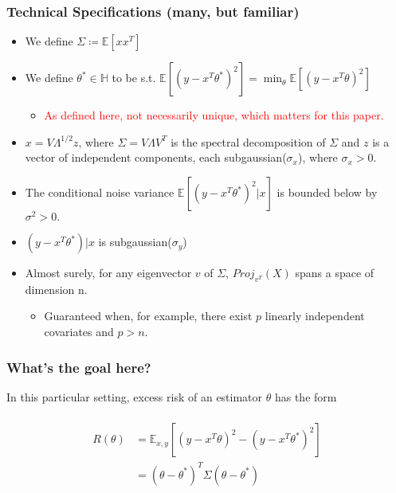 \documentclass[pdf]{beamer}
\begin{document}
\begin{frame}
\fontsize{9pt}{8pt}
\frametitle{Technical Specifications (many, but familiar)}

\begin{itemize}
\item We define $\Sigma \coloneqq \mathbb{E}[xx^{T}]$
\item We define $\theta^{*} \in \mathbb{H}$ to be s.t. $\mathbb{E}[(y - x^{T}\theta^{*})^{2}] = \min_{\theta}\mathbb{E}[(y - x^{T}\theta)^{2}]$
\begin{itemize}
    \fontsize{9pt}{8pt}
    \item \textcolor{red}{As defined here, not necessarily unique, which matters for this paper.}
\end{itemize}
\item $x = V\Lambda^{1/2}z$, where $\Sigma = V\Lambda V^{T}$ is the spectral decomposition of $\Sigma$ and $z$ is a vector of independent components, each subgaussian($\sigma_{x}$), where $\sigma_{x} > 0.$
\item The conditional noise variance $\mathbb{E}[(y - x^{T}\theta^{*})^{2}|x]$ is bounded below by $\sigma^{2} > 0.$
\item $(y - x^{T}\theta^{*})|x$ is subgaussian($\sigma_{y}$)
\item Almost surely, for any eigenvector $v$ of $\Sigma$, $Proj_{v^{T}}(X)$ spans a space of dimension n.
    \begin{itemize}
    \fontsize{9pt}{8pt}
    \item Guaranteed when, for example, there exist $p$ linearly independent covariates and $p > n.$ 
    \end{itemize}
\end{itemize}

\end{frame}

\begin{frame}
\frametitle{What's the goal here?}
In this particular setting, excess risk of an estimator $\theta$ has the form \\~\\

\begin{align*}
 R(\theta) & = \mathbb{E}_{x,y}[ (y-x^{T}\theta)^{2} -  (y-x^{T}\theta^{*})^{2}] \\
& = (\theta - \theta^{*})^{T}\Sigma(\theta - \theta^{*})
\end{align*}

\\

\end{frame}
\end{document}

